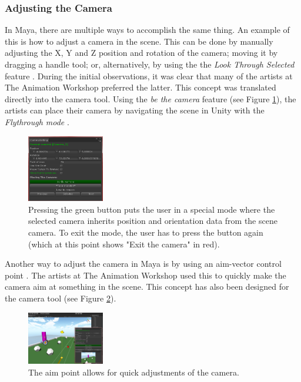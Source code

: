 \subsubsection{Adjusting the Camera}
In Maya, there are multiple ways to accomplish the same thing. An example of this is how to adjust a camera in the scene. This can be done by manually adjusting the X, Y and Z position and rotation of the camera; moving it by dragging a handle tool; or, alternatively, by using the the \textit{Look Through Selected} feature \cite{maya_lookThrough}. During the initial observations, it was clear that many of the artists at The Animation Workshop preferred the latter. This concept was translated directly into the camera tool. Using the \textit{be the camera} feature (see Figure \ref{fig:beTheCam}), the artists can place their camera by navigating the scene in Unity with the \textit{Flythrough mode} \cite{unity_flyMode}.

\begin{figure}[htbp]
\centering
\includegraphics[width=0.3\textwidth]{Pics/be_the_cam_new}
\caption{Pressing the green button puts the user in a special mode where the selected camera inherits position and orientation data from the scene camera. To exit the mode, the user has to press the button again (which at this point shows "Exit the camera" in red).}
\label{fig:beTheCam}
\end{figure}

Another way to adjust the camera in Maya is by using an aim-vector control point \cite{maya_camAim}. The artists at The Animation Workshop used this to quickly make the camera aim at something in the scene. This concept has also been designed for the camera tool (see Figure \ref{fig:aimPoint}).

\begin{figure}[htbp]
\centering
\includegraphics[width=0.3\textwidth]{Pics/aimPoint}
\caption{The aim point allows for quick adjustments of the camera.}
\label{fig:aimPoint}
\end{figure}

